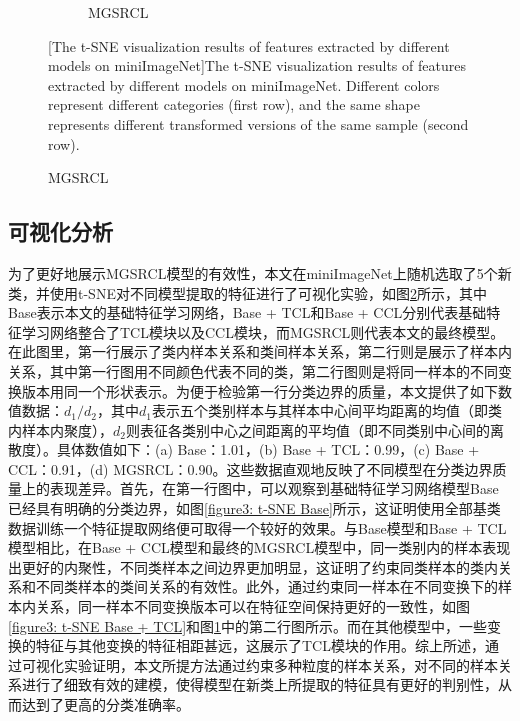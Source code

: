 \begin{figure}[h!]
\begin{subfigure}{0.24\columnwidth}
    \caption{MGSRCL}
    \label{figure3: t-SNE MGSRCL}
    \end{subfigure}
    [The t-SNE visualization results of features extracted by different models on miniImageNet]{The t-SNE visualization results of features extracted by different models on miniImageNet. Different colors represent different categories (first row), and the same shape represents different transformed versions of the same sample (second row).}
    \label{figure3: t-SNE}
\end{figure}


\subsection[\hspace{-2pt}可视化分析]{{\heiti{} \hspace{-8pt}可视化分析}}\label{section3: 可视化分析}

为了更好地展示MGSRCL模型的有效性，本文在miniImageNet上随机选取了5个新类，并使用t-SNE对不同模型提取的特征进行了可视化实验，如图\ref{figure3: t-SNE}所示，其中Base表示本文的基础特征学习网络，Base + TCL和Base + CCL分别代表基础特征学习网络整合了TCL模块以及CCL模块，而MGSRCL则代表本文的最终模型。在此图里，第一行展示了类内样本关系和类间样本关系，第二行则是展示了样本内关系，其中第一行图用不同颜色代表不同的类，第二行图则是将同一样本的不同变换版本用同一个形状表示。为便于检验第一行分类边界的质量，本文提供了如下数值数据：$d_1/d_2$，其中$d_1$表示五个类别样本与其样本中心间平均距离的均值（即类内样本内聚度），$d_2$则表征各类别中心之间距离的平均值（即不同类别中心间的离散度）。具体数值如下：(a) Base：1.01，(b) Base + TCL：0.99，(c) Base + CCL：0.91，(d) MGSRCL：0.90。这些数据直观地反映了不同模型在分类边界质量上的表现差异。首先，在第一行图中，可以观察到基础特征学习网络模型Base已经具有明确的分类边界，如图\ref{figure3: t-SNE Base}所示，这证明使用全部基类数据训练一个特征提取网络便可取得一个较好的效果。与Base模型和Base + TCL模型相比，在Base + CCL模型和最终的MGSRCL模型中，同一类别内的样本表现出更好的内聚性，不同类样本之间边界更加明显，这证明了约束同类样本的类内关系和不同类样本的类间关系的有效性。此外，通过约束同一样本在不同变换下的样本内关系，同一样本不同变换版本可以在特征空间保持更好的一致性，如图\ref{figure3: t-SNE Base + TCL}和图\ref{figure3: t-SNE MGSRCL}中的第二行图所示。而在其他模型中，一些变换的特征与其他变换的特征相距甚远，这展示了TCL模块的作用。综上所述，通过可视化实验证明，本文所提方法通过约束多种粒度的样本关系，对不同的样本关系进行了细致有效的建模，使得模型在新类上所提取的特征具有更好的判别性，从而达到了更高的分类准确率。

